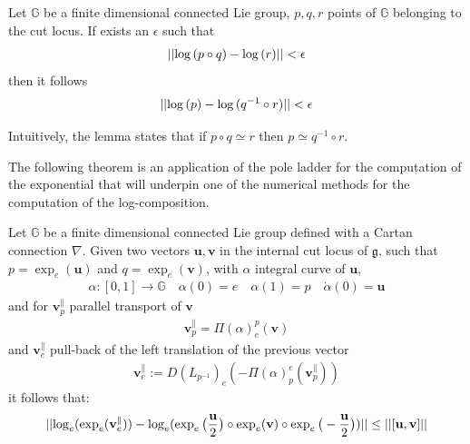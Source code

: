 \begin{lemma}
	Let $\mathbb{G}$ be a finite dimensional connected Lie group, $p,q,r$ points of $\mathbb{G}$ belonging to the cut locus. If exists an $\epsilon$ such that 
	\begin{align*}
		\vert\lvert \log{(p\circ q)}  - \log{(r)} \rvert\vert< \epsilon
	\end{align*}
	then it follows
	\begin{align*}
	\vert\lvert \log{(p)}  - \log{(q^{-1} \circ r)} \rvert\vert< \epsilon
	\end{align*}
\end{lemma}
Intuitively, the lemma states that if $p\circ q \simeq r $ then $p \simeq q^{-1} \circ r $. 

The following theorem is an application of the pole ladder \cite{lorenzi2011schild} for the computation of the exponential that will underpin one of the numerical methods for the computation of the log-composition.
\begin{theorem}\label{th:local_approximation_theorem}
	Let $\mathbb{G}$ be a finite dimensional connected Lie group defined with a Cartan connection $\nabla$. 
	Given two vectors $\mathbf{u}, \mathbf{v}$ in the internal cut locus of $\mathfrak{g}$, such that 
	$p = \exp_{e}(\mathbf{u}) $ and	$q = \exp_{e}(\mathbf{v})$, with $\alpha$ integral curve of $\mathbf{u}$,
	\begin{align*}
	\alpha : [0,1] \rightarrow \mathbb{G} \quad \alpha(0) = e  \quad \alpha(1) = p \quad
	\dot{\alpha}(0) = \mathbf{u}
	\end{align*}
	and for $\mathbf{v}_{p}^{\parallel}$ parallel transport of $\mathbf{v}$
	\begin{align*}
	\mathbf{v}_{p}^{\parallel} =  \Pi(\alpha)_{e}^{p}(\mathbf{v})
	\end{align*}
	and $\mathbf{v}_{e}^{\parallel}$ pull-back of the left translation of  the previous vector
	\begin{align*}
	 \mathbf{v}_{e}^{\parallel} := D(L_{p^{-1}})_{e}( -\Pi(\alpha)_{p}^{e}(\mathbf{v}_{p}^{\parallel}))
	\end{align*}
	it follows that:
	\begin{align*}
		\vert\lvert 
			\log_{e}(\exp_{e}(\mathbf{v}_{e}^{\parallel} ))
			-
			\log_{e}(\exp_{e}\big(\frac{\mathbf{u}}{2}\big)   
				\circ  \exp_{e}(\mathbf{v}) 
				\circ \exp_{e}\big(-\frac{\mathbf{u}}{2}\big))
			 \rvert\vert \leq\vert\lvert [\mathbf{u}, \mathbf{v}] \rvert\vert
	\end{align*}
\end{theorem}
